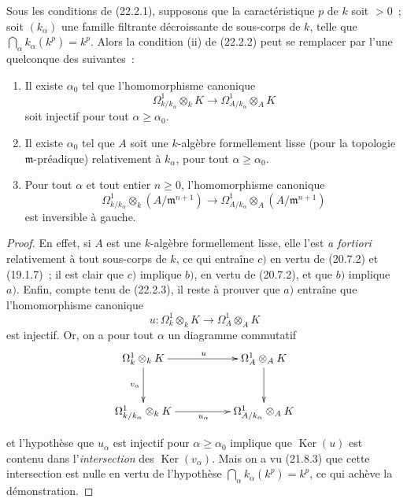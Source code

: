 \begin{proposition}[22.2.8]
\label{0.22.2.8-fr}
Sous les conditions de (22.2.1), supposons que la caractéristique $p$ de $k$
soit $>0$~; soit $(k_\alpha)$ une famille filtrante décroissante de
sous-corps de $k$, telle que
$\bigcap_\alpha k_\alpha(k^p)=k^p$. Alors la condition (ii) de (22.2.2) peut
se remplacer par l'une quelconque des suivantes~:
\begin{enumerate}
  \item[a)] Il existe $\alpha_0$ tel que l'homomorphisme canonique
  \[
    \Omega^1_{k/k_\alpha}\otimes_kK
    \longrightarrow\Omega^1_{A/k_\alpha}\otimes_AK
  \]
  soit injectif pour tout $\alpha\geqslant\alpha_0$.
  \item[b)] Il existe $\alpha_0$ tel que $A$ soit une $k$-algèbre
  formellement lisse (pour la topologie $\mathfrak m$-préadique) relativement
  à $k_\alpha$, pour tout $\alpha\geqslant\alpha_0$.
  \item[c)] Pour tout $\alpha$ et tout entier $n\geqslant0$,
  l'homomorphisme canonique
  \[
    \Omega^1_{k/k_\alpha}\otimes_k(A/\mathfrak m^{n+1})
    \longrightarrow
    \Omega^1_{A/k_\alpha}\otimes_A(A/\mathfrak m^{n+1})
  \]
  est inversible à gauche.
\end{enumerate}
\end{proposition}

\begin{proof}
En effet, si $A$ est une $k$-algèbre formellement lisse, elle l'est \emph{a
fortiori} relativement à tout sous-corps de $k$, ce qui entraîne $c)$ en
vertu de (20.7.2) et (19.1.7)~; il est clair que $c)$ implique $b)$, en vertu
de (20.7.2), et que $b)$ implique $a)$. Enfin, compte tenu de (22.2.3), il
reste à prouver que $a)$ entraîne que l'homomorphisme canonique
\[
  u:\Omega^1_k\otimes_kK\longrightarrow\Omega^1_A\otimes_AK
\]
est injectif. Or, on a pour tout $\alpha$ un diagramme commutatif
\[
\xymatrix@C=5em@R=3em{
  \Omega^1_k\otimes_kK \ar[r]^{u} \ar[d]_{v_\alpha} &
  \Omega^1_A\otimes_AK \ar[d] \\
  \Omega^1_{k/k_\alpha}\otimes_kK \ar[r]_{u_\alpha} &
  \Omega^1_{A/k_\alpha}\otimes_AK
}
\]


et l'hypothèse que $u_\alpha$ est injectif pour
$\alpha\geqslant\alpha_0$ implique que $\operatorname{Ker}(u)$ est contenu
dans l'\emph{intersection} des $\operatorname{Ker}(v_\alpha)$. Mais on a vu
(21.8.3) que cette intersection est nulle en vertu de l'hypothèse
$\bigcap_\alpha k_\alpha(k^p)=k^p$, ce qui achève la démonstration.
\end{proof}

